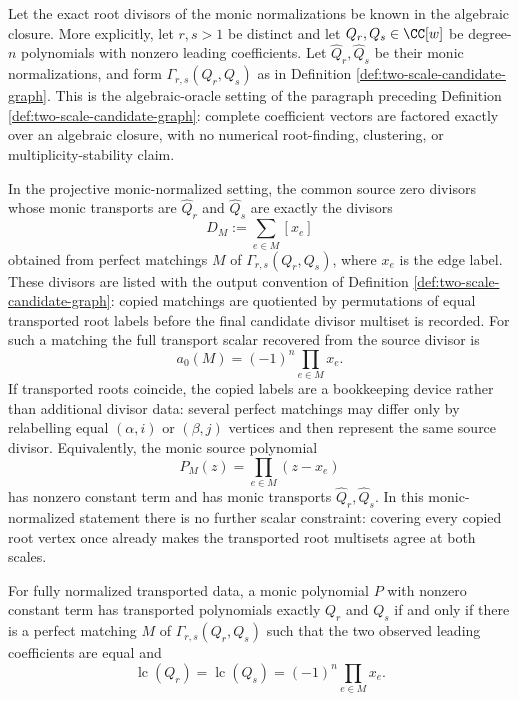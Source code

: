 \begin{theorem}\label{thm:two-scale-matching-inverse}
Let the exact root divisors of the monic normalizations be known in the
algebraic closure.  More explicitly, let \(r,s>1\) be distinct and let
\(Q_r,Q_s\in\CC[w]\) be degree-\(n\) polynomials with nonzero leading
coefficients.  Let \(\widehat Q_r,\widehat Q_s\) be their monic
normalizations, and form
\(\Gamma_{r,s}(Q_r,Q_s)\) as in Definition
\ref{def:two-scale-candidate-graph}.
This is the algebraic-oracle setting of the paragraph preceding
Definition \ref{def:two-scale-candidate-graph}: complete coefficient
vectors are factored exactly over an algebraic closure, with no numerical
root-finding, clustering, or multiplicity-stability claim.

In the projective monic-normalized setting, the common source zero
divisors whose monic transports are \(\widehat Q_r\) and
\(\widehat Q_s\) are exactly the divisors
\[
D_M:=\sum_{e\in M}[x_e]
\]
obtained from perfect matchings \(M\) of
\(\Gamma_{r,s}(Q_r,Q_s)\), where \(x_e\) is the edge label.  These
divisors are listed with the output convention of Definition
\ref{def:two-scale-candidate-graph}: copied matchings are quotiented
by permutations of equal transported root labels before the final
candidate divisor multiset is recorded.  For such a matching the full
transport scalar recovered from the source divisor is
\[
a_0(M)=(-1)^n\prod_{e\in M}x_e .
\]
If transported roots coincide, the copied labels are a bookkeeping
device rather than additional divisor data: several perfect matchings
may differ only by relabelling equal \((\alpha,i)\) or \((\beta,j)\)
vertices and then represent the same source divisor.
Equivalently, the monic source polynomial
\[
P_M(z)=\prod_{e\in M}(z-x_e)
\]
has nonzero constant term and has monic transports
\(\widehat Q_r,\widehat Q_s\).  In this monic-normalized statement
there is no further scalar constraint: covering every copied root
vertex once already makes the transported root multisets agree at both
scales.

For fully normalized transported data, a monic polynomial \(P\) with
nonzero constant term has transported polynomials exactly \(Q_r\) and
\(Q_s\) if and only if there is a perfect matching \(M\) of
\(\Gamma_{r,s}(Q_r,Q_s)\) such that the two observed leading
coefficients are equal and
\[
\operatorname{lc}(Q_r)=\operatorname{lc}(Q_s)
=(-1)^n\prod_{e\in M}x_e .
\]
\end{theorem}

